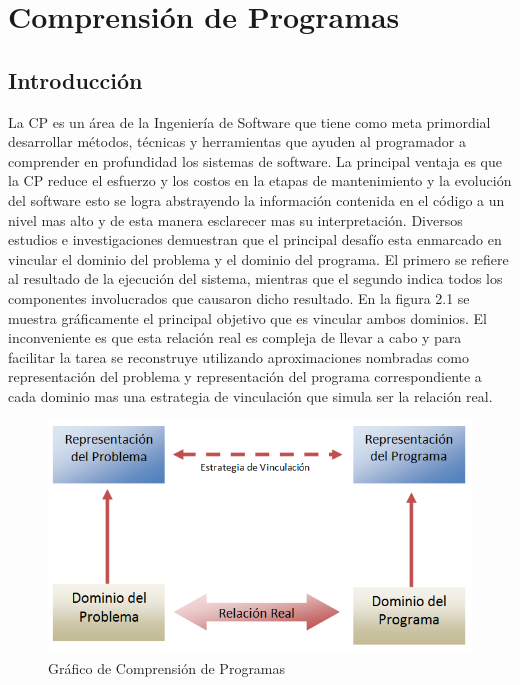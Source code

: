 \documentclass[12pt]{report}
\begin{document}


\chapter{Comprensión de Programas}
\section{Introducción}
La CP es un área de la Ingeniería de Software que tiene como meta primordial desarrollar métodos, técnicas y herramientas que ayuden al programador a comprender en profundidad los sistemas de software. La principal ventaja es que la CP reduce el esfuerzo y los costos en la etapas de mantenimiento y la evolución del software esto se logra abstrayendo la información contenida en el código a un nivel mas alto y de esta manera esclarecer mas su interpretación.\cite{MPMR07}
Diversos estudios e investigaciones demuestran que el principal desafío esta enmarcado en vincular el dominio del problema y el dominio del programa. El primero se refiere al resultado de la ejecución del sistema, mientras que el segundo indica todos los componentes involucrados que causaron dicho resultado. En la figura 2.1 se muestra gráficamente el principal objetivo que es vincular ambos dominios. El inconveniente es que esta relación real es compleja de llevar a cabo y para facilitar la tarea se reconstruye utilizando aproximaciones nombradas como representación del problema y representación del programa correspondiente a cada dominio mas una estrategia de vinculación que simula ser la relación real.

\begin{figure}[h] %
\centering
\includegraphics[scale= 0.25]{./dom.png}
\caption{Gráfico de Comprensión de Programas}
\end{figure} \label{captura1}
\end{document}
